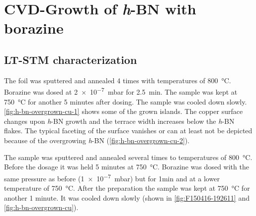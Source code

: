 		
	\section{CVD-Growth of \textit{h}-BN with borazine}
	 \subsection{LT-STM characterization}
The foil was sputtered and annealed 4 times with temperatures of \SI{800}{\celsius}. Borazine was dosed at \SI{2e-7}{\milli \bar} for \SI{2.5}{\minute}. The sample was kept at \SI{750}{\celsius} for another 5 minutes after dosing. The sample was cooled down slowly. \autoref{fig:h-bn-overgrown-cu-1} shows some of the grown islands. The copper surface changes upon \textit{h}-BN growth and the terrace width increases below the \textit{h}-BN flakes. The typical faceting of the surface vanishes or can at least not be depicted because of the overgrowing \textit{h}-BN (\autoref{fig:h-bn-overgrown-cu-2}). 

	
The sample was sputtered and annealed several times to temperatures of \SI{800}{\celsius}. Before the dosage it was held 5 minutes at \SI{750}{\celsius}. Borazine was dosed with the same pressure as before (\SI{1e-7}{\milli \bar}) but for 1min and at a lower temperature of \SI{750}{\celsius}. After the preparation the sample was kept at \SI{750}{\celsius} for another 1 minute. It was cooled down slowly (shown in \autoref{fig:F150416-192611} and \autoref{fig:h-bn-overgrown-cu}).

